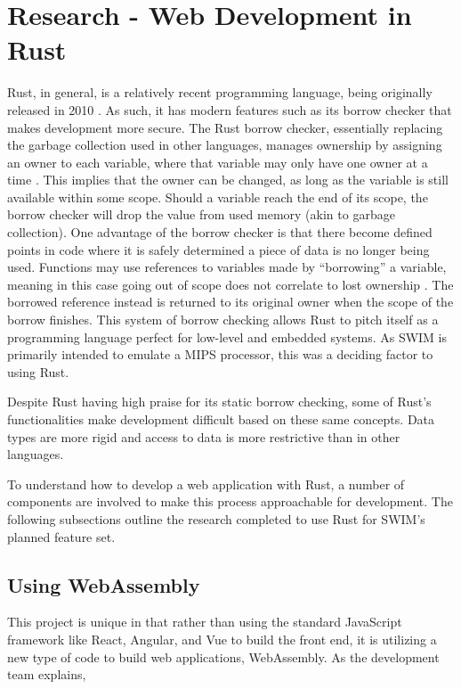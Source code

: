 \documentclass[
    paper=letter,
    parskip=half,
    fontsize=12pt,
    titlepage=firstiscover,
    toc=bibliography,
    numbers=endperiod
]{scrartcl}
\let\oldsection\section
\renewcommand{\section}{\newpage\oldsection}
\begin{document}
\section{Research - Web Development in Rust}

Rust, in general, is a relatively recent programming language, being
originally released in 2010 \cite{asay2021}. As such, it has modern
features such as its borrow checker that makes development more secure.
The Rust borrow checker, essentially replacing the garbage collection
used in other languages, manages ownership by assigning an owner to each
variable, where that variable may only have one owner at a time
\cite{rust-book-ownership}. This implies that the owner can be changed,
as long as the variable is still available within some scope. Should a
variable reach the end of its scope, the borrow checker will drop the
value from used memory (akin to garbage collection). One advantage of
the borrow checker is that there become defined points in code where it
is safely determined a piece of data is no longer being used. Functions
may use references to variables made by ``borrowing'' a variable,
meaning in this case going out of scope does not correlate to lost
ownership \cite{rust-book-borrowing}. The borrowed reference instead is
returned to its original owner when the scope of the borrow finishes.
This system of borrow checking allows Rust to pitch itself as a
programming language perfect for low-level and embedded systems. As SWIM
is primarily intended to emulate a MIPS processor, this was a deciding
factor to using Rust.

Despite Rust having high praise for its static borrow checking, some of
Rust's functionalities make development difficult based on these same
concepts. Data types are more rigid and access to data is more
restrictive than in other languages.

To understand how to develop a web application with Rust, a number of
components are involved to make this process approachable for
development. The following subsections outline the research completed to
use Rust for SWIM's planned feature set.

\subsection{Using WebAssembly}

This project is unique in that rather than using the standard JavaScript
framework like React, Angular, and Vue to build the front end, it is
utilizing a new type of code to build web applications, WebAssembly. As
the development team explains,
\end{document}
